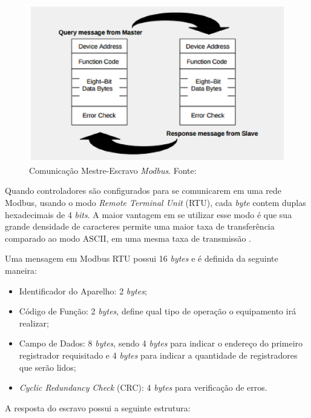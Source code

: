     \begin{figure}[!htb]
        \centering
        \includegraphics[keepaspectratio=true,scale=0.8]{figuras/mestre_escravo.eps}
        \caption{Comunicação Mestre-Escravo \textit{Modbus}. Fonte: \cite{modbus}}
        \label{mestre_escravo}
    \end{figure}

    Quando controladores são configurados para se comunicarem em uma rede Modbus, usando o modo \textit{Remote Terminal Unit} (RTU), cada \textit{byte} contem duplas hexadecimais de 4 \textit{bits}. A maior vantagem em se utilizar esse modo é que sua grande densidade de caracteres permite uma maior taxa de transferência comparado ao modo ASCII, em uma mesma taxa de transmissão \cite{modbus}.

    Uma mensagem em Modbus RTU possui 16 \textit{bytes} e é definida da seguinte maneira:
    \begin{itemize}
        \item Identificador do Aparelho: 2 \textit{bytes};
        \item Código de Função: 2 \textit{bytes}, define qual tipo de operação o equipamento irá realizar;
        \item Campo de Dados: 8 \textit{bytes}, sendo 4 \textit{bytes} para indicar o endereço do primeiro registrador requisitado e 4 \textit{bytes} para indicar a quantidade de registradores que serão lidos;
        \item \textit{Cyclic Redundancy Check} (CRC): 4 \textit{bytes} para verificação de erros.
    \end{itemize}

    A resposta do escravo possui a seguinte estrutura:

